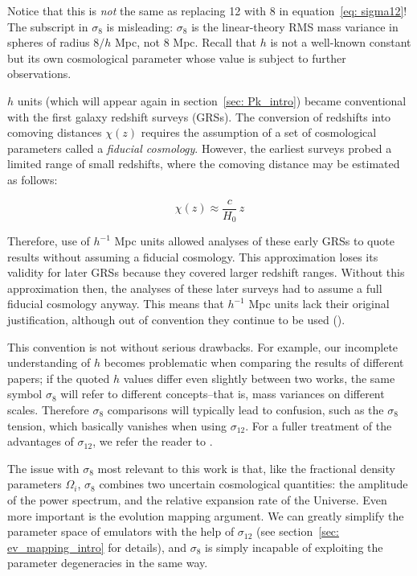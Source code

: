 Notice that this is \textit{not} the same as replacing 12 with 8 in
equation~\ref{eq: sigma12}! The subscript in $\sigma_8$ is misleading:
$\sigma_8$ is the linear-theory RMS mass variance in spheres of radius
$8 / h$ Mpc, not 8 Mpc. Recall that $h$ is not a well-known constant but its 
own  cosmological parameter whose value is subject to further observations.

$h$ units (which will appear again in section~\ref{sec: Pk_intro}) became
conventional with the first galaxy redshift surveys (GRSs). The conversion of
redshifts into comoving distances $\chi(z)$ requires the assumption of a set 
of
cosmological parameters called a \textit{fiducial cosmology}. However, the
earliest surveys probed a limited range of small redshifts, where the
comoving distance may be estimated as follows:

\begin{equation}
\label{eq: comov_dist_approx}
\chi(z) \approx \frac{c}{H_0} \, z
\end{equation}

Therefore, use of $h^{-1}$ Mpc units allowed analyses of these early GRSs
to quote results without assuming a fiducial cosmology. This
approximation loses its validity for later GRSs because they covered larger
redshift ranges. Without this approximation then, the analyses of these later
surveys had to assume a full fiducial cosmology anyway. This means that
$h^{-1}$ Mpc units lack their original justification, although out of
convention they continue to be used ().

This convention is not without serious drawbacks.
For example, our incomplete understanding of $h$
becomes problematic when comparing the results of different papers;
if the quoted $h$ values differ even slightly between two works, the same
symbol $\sigma_8$ will refer to different concepts--that is, mass variances on
different scales. Therefore $\sigma_8$ comparisons will typically lead to
confusion, such as the $\sigma_8$ tension, which basically vanishes when using
$\sigma_{12}$. For a fuller treatment of the advantages of $\sigma_{12}$, we
refer the reader to .

The issue with $\sigma_8$ most relevant to this work is that, like the
fractional density parameters $\Omega_i$, $\sigma_8$ combines two uncertain
cosmological quantities: the amplitude of the power spectrum, and the
relative expansion rate of the Universe. Even more important is the evolution 
mapping argument. We can greatly simplify the
parameter space of emulators with the help of $\sigma_{12}$
(see section~\ref{sec: ev_mapping_intro} for details), and $\sigma_8$
is simply incapable of exploiting the parameter degeneracies in the same way.


